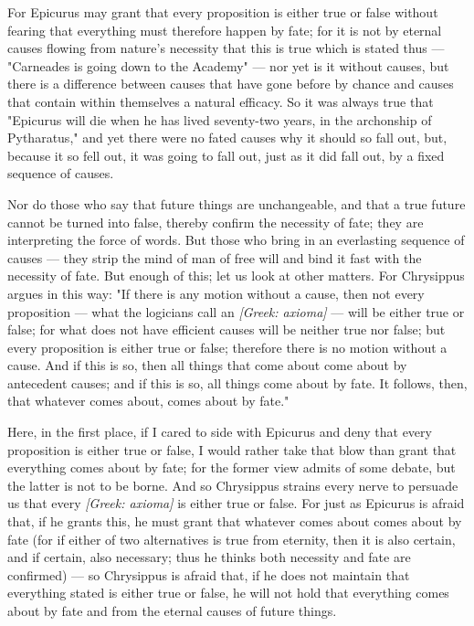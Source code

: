  For Epicurus may grant that every proposition is either true or false without fearing that everything must therefore happen by fate; for it is not by eternal causes flowing from nature's necessity that this is true which is stated thus — "Carneades is going down to the Academy" — nor yet is it without causes, but there is a difference between causes that have gone before by chance and causes that contain within themselves a natural efficacy. So it was always true that "Epicurus will die when he has lived seventy-two years, in the archonship of Pytharatus," and yet there were no fated causes why it should so fall out, but, because it so fell out, it was going to fall out, just as it did fall out, by a fixed sequence of causes.

 Nor do those who say that future things are unchangeable, and that a true future cannot be turned into false, thereby confirm the necessity of fate; they are interpreting the force of words. But those who bring in an everlasting sequence of causes — they strip the mind of man of free will and bind it fast with the necessity of fate. But enough of this; let us look at other matters. For Chrysippus argues in this way: "If there is any motion without a cause, then not every proposition — what the logicians call an \textit{[Greek: axioma]} — will be either true or false; for what does not have efficient causes will be neither true nor false; but every proposition is either true or false; therefore there is no motion without a cause. And if this is so, then all things that come about come about by antecedent causes; and if this is so, all things come about by fate. It follows, then, that whatever comes about, comes about by fate."

 Here, in the first place, if I cared to side with Epicurus and deny that every proposition is either true or false, I would rather take that blow than grant that everything comes about by fate; for the former view admits of some debate, but the latter is not to be borne. And so Chrysippus strains every nerve to persuade us that every \textit{[Greek: axioma]} is either true or false. For just as Epicurus is afraid that, if he grants this, he must grant that whatever comes about comes about by fate (for if either of two alternatives is true from eternity, then it is also certain, and if certain, also necessary; thus he thinks both necessity and fate are confirmed) — so Chrysippus is afraid that, if he does not maintain that everything stated is either true or false, he will not hold that everything comes about by fate and from the eternal causes of future things.

